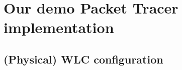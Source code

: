 


\clearpage %
\appendix

\section{Our demo Packet Tracer implementation} \label{config}


\subsection{(Physical) WLC configuration} \label{configwlc}

\inputminted[fontsize=\tiny,linenos,breaklines]{text}{./wirelessimplementation/wlc.cisco}



